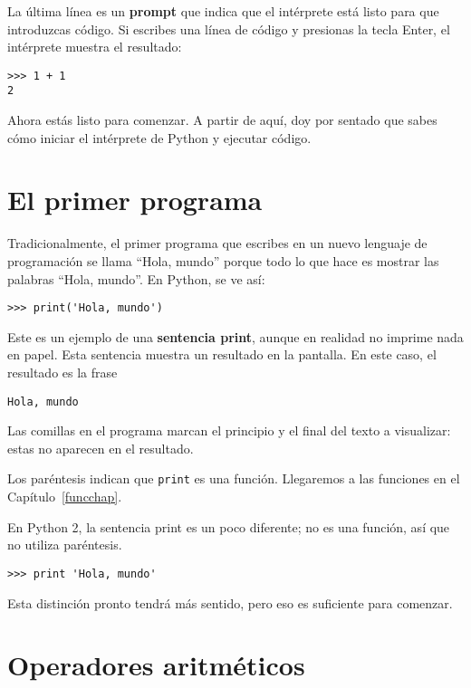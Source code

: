 \documentclass[10pt]{book}
\begin{document}
La última línea es un {\bf prompt} que indica que el intérprete está listo
para que introduzcas código.
Si escribes una línea de código y presionas la tecla Enter, el intérprete
muestra el resultado:

\begin{verbatim}
>>> 1 + 1
2
\end{verbatim}
%
Ahora estás listo para comenzar.
A partir de aquí, doy por sentado que sabes cómo iniciar el intérprete de Python
y ejecutar código.


\section{El primer programa}
\label{hello}

Tradicionalmente, el primer programa que escribes en un nuevo lenguaje
de programación se llama ``Hola, mundo'' porque todo lo que hace es mostrar
las palabras ``Hola, mundo''.  En Python, se ve así:

\begin{verbatim}
>>> print('Hola, mundo')
\end{verbatim}
%
Este es un ejemplo de una {\bf sentencia print}, aunque
en realidad no imprime nada en papel.  Esta sentencia muestra un resultado en la
pantalla.  En este caso, el resultado es la frase

\begin{verbatim}
Hola, mundo
\end{verbatim}
%
Las comillas en el programa marcan el principio y el final
del texto a visualizar: estas no aparecen en el resultado.

Los paréntesis indican que {\tt print} es una función.  Llegaremos
a las funciones en el Capítulo~\ref{funcchap}.
 

En Python 2, la sentencia print es un poco diferente; no es
una función, así que no utiliza paréntesis.

\begin{verbatim}
>>> print 'Hola, mundo'
\end{verbatim}
%
Esta distinción pronto tendrá más sentido, pero eso es suficiente para
comenzar.


\section{Operadores aritméticos}
\end{document}

